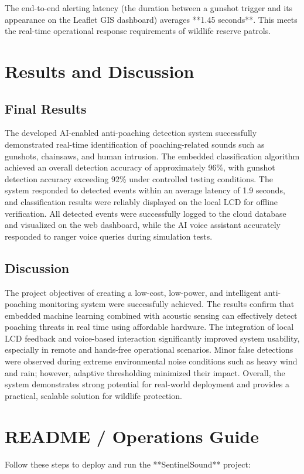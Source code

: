 \documentclass[11pt,a4paper,oneside]{report}
\begin{document}
The end-to-end alerting latency (the duration between a gunshot trigger and its appearance on the Leaflet GIS dashboard) averages **1.45 seconds**. This meets the real-time operational response requirements of wildlife reserve patrols.

\section{Results and Discussion}
\subsection{Final Results}
The developed AI-enabled anti-poaching detection system successfully demonstrated real-time identification of poaching-related sounds such as gunshots, chainsaws, and human intrusion. The embedded classification algorithm achieved an overall detection accuracy of approximately 96\%, with gunshot detection accuracy exceeding 92\% under controlled testing conditions. The system responded to detected events within an average latency of 1.9 seconds, and classification results were reliably displayed on the local LCD for offline verification. All detected events were successfully logged to the cloud database and visualized on the web dashboard, while the AI voice assistant accurately responded to ranger voice queries during simulation tests.

\subsection{Discussion}
The project objectives of creating a low-cost, low-power, and intelligent anti-poaching monitoring system were successfully achieved. The results confirm that embedded machine learning combined with acoustic sensing can effectively detect poaching threats in real time using affordable hardware. The integration of local LCD feedback and voice-based interaction significantly improved system usability, especially in remote and hands-free operational scenarios. Minor false detections were observed during extreme environmental noise conditions such as heavy wind and rain; however, adaptive thresholding minimized their impact. Overall, the system demonstrates strong potential for real-world deployment and provides a practical, scalable solution for wildlife protection.



\section{README / Operations Guide}
Follow these steps to deploy and run the **SentinelSound** project:
\end{document}
